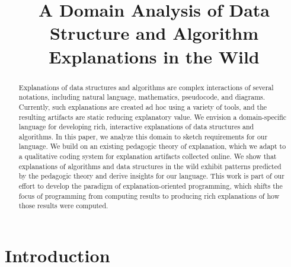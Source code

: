 \documentclass[conference]{IEEEtran}
\begin{document}
\title{A Domain Analysis of Data Structure and Algorithm Explanations in the Wild}


\author{
\and
{}
\and
{} 
}


\maketitle


\begin{abstract}
Explanations of data structures and algorithms are complex interactions of
several notations, including natural language, mathematics, pseudocode, and
diagrams. Currently, such explanations are created ad hoc using a variety of
tools, and the resulting artifacts are static reducing explanatory value. We
envision a domain-specific language for developing rich, interactive
explanations of data structures and algorithms. In this paper, we analyze this
domain to sketch requirements for our language. We build on an existing
pedagogic theory of explanation, which we adapt to a qualitative coding system
for explanation artifacts collected online. We show that explanations of
algorithms and data structures in the wild exhibit patterns predicted by the
pedagogic theory and derive insights for our language. This work is part of our
effort to develop the paradigm of explanation-oriented programming, which
shifts the focus of programming from computing results to producing rich
explanations of how those results were computed.
\end{abstract}


\IEEEpeerreviewmaketitle


\section{Introduction}
\end{document}
